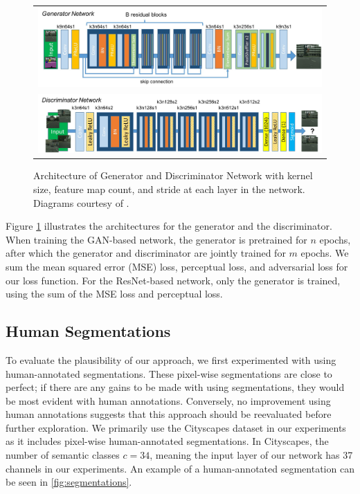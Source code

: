 \documentclass[10pt,twocolumn,letterpaper]{article}
\begin{document}
\begin{figure}[ht!]
\begin{center}
    \begin{tabular}{c}
	\includegraphics[width=6.5in]{images/generator_architecture.png} \\
	\includegraphics[width=6.5in]{images/discriminator_architecture.png}
    \end{tabular}
\end{center}
    \caption{Architecture of Generator and Discriminator Network with kernel
    size, feature map count, and stride at each layer in the network. Diagrams
    courtesy of \cite{SRGAN}.}
    \label{fig:architecture}
\end{figure}

Figure \ref{fig:architecture} illustrates the architectures for the generator and
the discriminator. When training the GAN-based network, the generator is
pretrained for $n$ epochs, after which the generator and discriminator are
jointly trained for $m$ epochs. We sum the mean squared error (MSE) loss,
perceptual loss, and adversarial loss for our loss function. For the
ResNet-based network, only the generator is trained, using the sum of the MSE
loss and perceptual loss.

\subsection{Human Segmentations}
To evaluate the plausibility of our approach, we first experimented with using
human-annotated segmentations. These pixel-wise segmentations are close to
perfect; if there are any gains to be made with using segmentations, they would
be most evident with human annotations. Conversely, no improvement using human
annotations suggests that this approach should be reevaluated before further
exploration. We primarily use the Cityscapes \cite{Cityscapes} dataset in our
experiments as it includes pixel-wise human-annotated segmentations. In
Cityscapes, the number of semantic classes $c = 34$, meaning the input layer of
our network has 37 channels in our experiments. An example of a human-annotated
segmentation can be seen in \ref{fig:segmentations}.
\end{document}
